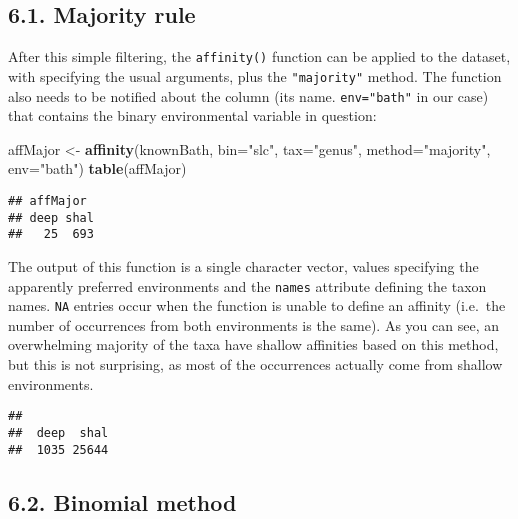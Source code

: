 \documentclass[]{article}
\newenvironment{Shaded}{\begin{snugshade}}{\end{snugshade}}
\newcommand{\DataTypeTok}[1]{\textcolor[rgb]{0.13,0.29,0.53}{#1}}
\newcommand{\KeywordTok}[1]{\textcolor[rgb]{0.13,0.29,0.53}{\textbf{#1}}}
\newcommand{\NormalTok}[1]{#1}
\newcommand{\OperatorTok}[1]{\textcolor[rgb]{0.81,0.36,0.00}{\textbf{#1}}}
\newcommand{\StringTok}[1]{\textcolor[rgb]{0.31,0.60,0.02}{#1}}
\begin{document}
\hypertarget{majority-rule}{%
\subsection{6.1. Majority rule}\label{majority-rule}}

After this simple filtering, the \texttt{affinity()} function can be
applied to the dataset, with specifying the usual arguments, plus the
\texttt{"majority"} method. The function also needs to be notified about
the column (its name. \texttt{env="bath"} in our case) that contains the
binary environmental variable in question:

\begin{Shaded}
\begin{Highlighting}[]
\NormalTok{affMajor <-}\StringTok{ }\KeywordTok{affinity}\NormalTok{(knownBath, }\DataTypeTok{bin=}\StringTok{"slc"}\NormalTok{, }\DataTypeTok{tax=}\StringTok{"genus"}\NormalTok{, }
  \DataTypeTok{method=}\StringTok{"majority"}\NormalTok{, }\DataTypeTok{env=}\StringTok{"bath"}\NormalTok{)}
\KeywordTok{table}\NormalTok{(affMajor)}
\end{Highlighting}
\end{Shaded}

\begin{verbatim}
## affMajor
## deep shal 
##   25  693
\end{verbatim}

The output of this function is a single character vector, values
specifying the apparently preferred environments and the \texttt{names}
attribute defining the taxon names. \texttt{NA} entries occur when the
function is unable to define an affinity (i.e.~the number of occurrences
from both environments is the same). As you can see, an overwhelming
majority of the taxa have shallow affinities based on this method, but
this is not surprising, as most of the occurrences actually come from
shallow environments.

\begin{Shaded}
\end{Shaded}

\begin{verbatim}
## 
##  deep  shal 
##  1035 25644
\end{verbatim}

\hypertarget{binomial-method}{%
\subsection{6.2. Binomial method}\label{binomial-method}}
\end{document}
